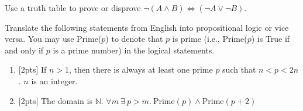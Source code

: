 \documentclass[12pt,twoside]{article}
\begin{document}
\newpage
\begin{problem}{10}
\bparts
{}
Use a truth table to prove or disprove $\neg (A \wedge B) \iff (\neg A \vee \neg B)$.

\item
Translate the following statements from English into propositional logic or vice versa. You may use Prime($p$) to denote that $p$ is prime (i.e., Prime($p$) is True if and only if $p$ is a prime number) in the logical statements.
\begin{enumerate}
\item{[2pts] If $n > 1$, then there is always at least one prime $p$ such that $n < p < 2n$. $n$ is an integer.
}
\newpage
\item{[2pts] The domain is $\mathbb{N}$. $\forall m ~ \exists~ p>m. ~\text{Prime}(p) \wedge \text{Prime}(p+2)$
}



\end{enumerate}
\end{problem}
\end{document}
